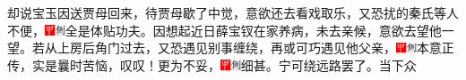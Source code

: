 却说宝玉因送贾母回来，待贾母歇了中觉，意欲还去看戏取乐，又恐扰的秦氏等人不便，{\includegraphics[width=3mm]{../Images/00002}\includegraphics[width=3mm]{../Images/00011}\footnotesize \kaishu 全是体贴功夫。}因想起近日薛宝钗在家养病，未去亲候，意欲去望他一望。若从上房后角门过去，又恐遇见别事缠绕，再或可巧遇见他父亲，{\includegraphics[width=3mm]{../Images/00002}\includegraphics[width=3mm]{../Images/00011}\footnotesize \kaishu 本意正传，实是曩时苦恼，叹叹！}更为不妥，{\includegraphics[width=3mm]{../Images/00002}\includegraphics[width=3mm]{../Images/00011}\footnotesize \kaishu 细甚。}宁可绕远路罢了。当下众